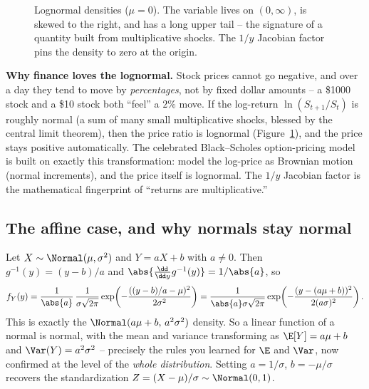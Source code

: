 \begin{figure}[H]
\centering
{}
\caption{Lognormal densities ($\mu=0$). The variable lives on $(0,\infty)$, is skewed to
the right, and has a long upper tail -- the signature of a quantity built from
multiplicative shocks. The $1/y$ Jacobian factor pins the density to zero at the origin.}
\label{ch16:fig-lognormal}
\end{figure}

\begin{applicationbox}
\textbf{Why finance loves the lognormal.} Stock prices cannot go negative, and over a day
they tend to move by \emph{percentages}, not by fixed dollar amounts -- a \$1000 stock and
a \$10 stock both ``feel'' a $2\%$ move. If the log-return $\ln(S_{t+1}/S_t)$ is roughly
normal (a sum of many small multiplicative shocks, blessed by the central limit theorem),
then the price ratio is lognormal (Figure~\ref{ch16:fig-lognormal}), and the price stays positive automatically. The
celebrated Black--Scholes option-pricing model is built on exactly this transformation:
model the log-price as Brownian motion (normal increments), and the price itself is
lognormal. The $1/y$ Jacobian factor is the mathematical fingerprint of ``returns are
multiplicative.''
\end{applicationbox}

\subsection{The affine case, and why normals stay normal}

\begin{example}
\label{ch16:affine-normal}
Let $X \sim \Normal(\mu,\sigma^2)$ and $Y = aX + b$ with $a \ne 0$. Then
$g^{-1}(y) = (y-b)/a$ and $\abs{\tfrac{\dd}{\dd y}g^{-1}(y)} = 1/\abs{a}$, so
\[
  f_Y(y) = \frac{1}{\abs{a}}\,
           \frac{1}{\sigma\sqrt{2\pi}}\exp\!\left(-\frac{((y-b)/a-\mu)^2}{2\sigma^2}\right)
         = \frac{1}{\abs{a}\sigma\sqrt{2\pi}}
           \exp\!\left(-\frac{(y-(a\mu+b))^2}{2(a\sigma)^2}\right).
\]
This is exactly the $\Normal(a\mu+b,\, a^2\sigma^2)$ density. So a linear function of a
normal is normal, with the mean and variance transforming as $\E[Y]=a\mu+b$ and
$\Var(Y)=a^2\sigma^2$ -- precisely the rules you learned for $\E$ and $\Var$, now confirmed
at the level of the \emph{whole distribution}. Setting $a=1/\sigma$, $b=-\mu/\sigma$
recovers the standardization $Z=(X-\mu)/\sigma \sim \Normal(0,1)$.
\end{example}

